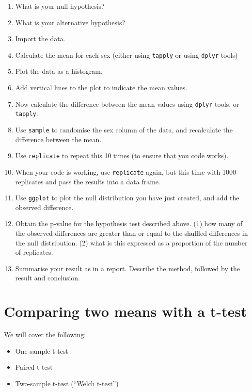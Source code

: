 \documentclass[
  a4paperpaper,
]{book}
\providecommand{\tightlist}{%
  \setlength{\itemsep}{0pt}\setlength{\parskip}{0pt}}
\begin{document}
\begin{enumerate}
\def\labelenumi{\arabic{enumi}.}
\item
  What is your null hypothesis?
\item
  What is your alternative hypothesis?
\item
  Import the data.
\item
  Calculate the mean for each sex (either using \texttt{tapply} or using \texttt{dplyr} tools)
\item
  Plot the data as a histogram.
\item
  Add vertical lines to the plot to indicate the mean values.
\item
  Now calculate the difference between the mean values using \texttt{dplyr} tools, or \texttt{tapply}.
\item
  Use \texttt{sample} to randomise the sex column of the data, and recalculate the difference between the mean.
\item
  Use \texttt{replicate} to repeat this 10 times (to ensure that you code works).
\item
  When your code is working, use \texttt{replicate} again, but this time with 1000 replicates and pass the results into a data frame.
\item
  Use \texttt{ggplot} to plot the null distribution you have just created, and add the observed difference.
\item
  Obtain the p-value for the hypothesis test described above. (1) how many of the observed differences are greater than or equal to the shuffled differences in the null distribution. (2) what is this expressed as a proportion of the number of replicates.
\item
  Summarise your result as in a report. Describe the method, followed by the result and conclusion.
\end{enumerate}

\hypertarget{comparing-two-means-with-a-t-test}{%
\chapter{Comparing two means with a t-test}\label{comparing-two-means-with-a-t-test}}

We will cover the following:

\begin{itemize}
\tightlist
\item
  One-sample t-test
\item
  Paired t-test
\item
  Two-sample t-test (``Welch t-test'')
\end{itemize}
\end{document}
